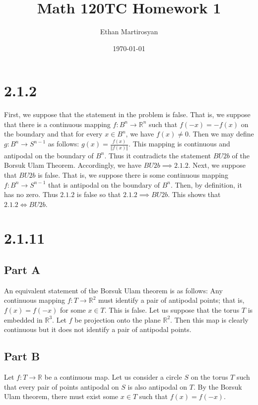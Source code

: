 \documentclass[12pt]{article}
\newcommand{\rr}{{\mathbb R}}
\begin{document}
 
\title{Math 120TC Homework 1}
\author{Ethan Martirosyan}
\date{\today}
\maketitle
{}
\hfuzz=50pt
\section*{2.1.2}
First, we suppose that the statement in the problem is false. That is, we suppose that there is a continuous mapping $f: B^n \rightarrow \rr^n$ such that $f(-x) = -f(x)$ on the boundary and that for every $x \in B^n$, we have $f(x) \neq 0$. Then we may define $g: B^n \rightarrow S^{n-1}$ as follows: $g(x) = \frac{f(x)}{\Vert f(x) \Vert}$. This mapping is continuous and antipodal on the boundary of $B^n$. Thus it contradicts the statement $BU2b$ of the Borsuk Ulam Theorem. Accordingly, we have $BU2b \implies 2.1.2$. Next, we suppose that $BU2b$ is false. That is, we suppose there is some continuous mapping $f: B^n \rightarrow S^{n-1}$ that is antipodal on the boundary of $B^n$. Then, by definition, it has no zero. Thus $2.1.2$ is false so that $2.1.2 \implies BU2b$. This shows that $2.1.2 \Leftrightarrow BU2b$.
\newpage
\section*{2.1.11}
\subsection*{Part A}
An equivalent statement of the Borsuk Ulam theorem is as follows:  Any continuous mapping $f: T \rightarrow \rr^2$ must identify a pair of antipodal points; that is, $f(x) = f(-x)$ for some $x \in T$. This is false. Let us suppose that the torus $T$ is embedded in $\rr^3$. Let $f$ be projection onto the plane $\rr^2$. Then this map is clearly continuous but it does not identify a pair of antipodal points.
\newpage
\subsection*{Part B}
Let $f: T \rightarrow \rr$ be a continuous map. Let us consider a circle $S$ on the torus $T$ such that every pair of points antipodal on $S$ is also antipodal on $T$. By the Borsuk Ulam theorem, there must exist some $x \in T$ such that $f(x) = f(-x)$.
\newpage
\end{document}
